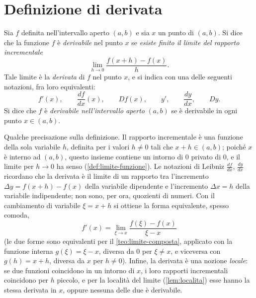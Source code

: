 \section{Definizione di derivata}
\label{sec:def-derivata}

\begin{definizione}[Derivata]\label{def:derivata}
Sia $f$ definita nell'intervallo aperto $(a,b)$ e sia $x$ un punto di $(a,b)$. Si dice
che la funzione $f$ è \emph{derivabile} nel punto $x$ se \emph{esiste finito il limite
del rapporto incrementale}
\begin{equation}\label{eq:def-derivata}
  \lim_{h\to0}\frac{f(x+h)-f(x)}{h}.
\end{equation}
Tale limite è la \emph{derivata} di $f$ nel punto $x$, e si indica con una delle
seguenti notazioni, fra loro equivalenti:
\begin{equation}\label{eq:notazioni-derivata}
  f'(x), \qquad \frac{df}{dx}(x), \qquad Df(x), \qquad y', \qquad \frac{dy}{dx}, \qquad Dy .
\end{equation}
Si dice che $f$ è \emph{derivabile nell'intervallo aperto} $(a,b)$ se è derivabile in ogni
punto $x\in(a,b)$.
\end{definizione}

Qualche precisazione sulla definizione. Il rapporto incrementale è una funzione della
sola variabile $h$, definita per i valori $h\neq0$ tali che $x+h\in(a,b)$; poiché $x$ è
interno ad $(a,b)$, questo insieme contiene un intorno di $0$ privato di $0$, e il limite
per $h\to0$ ha senso (\cref{def:limite-funzione}). Le notazioni di Leibniz
$\frac{df}{dx}$, $\frac{dy}{dx}$ ricordano che la derivata è il limite di un rapporto tra
l'incremento $\Delta y=f(x+h)-f(x)$ della variabile dipendente e l'incremento
$\Delta x=h$ della variabile indipendente; non sono, per ora, quozienti di numeri. Con il
cambiamento di variabile $\xi=x+h$ si ottiene la forma equivalente, spesso comoda,
\begin{equation}\label{eq:derivata-xi}
  f'(x)=\lim_{\xi\to x}\frac{f(\xi)-f(x)}{\xi-x}
\end{equation}
(le due forme sono equivalenti per il \cref{teo:limite-composta}, applicato con la
funzione interna $g(\xi)=\xi-x$, diversa da $0$ per $\xi\neq x$, e viceversa con
$g(h)=x+h$, diversa da $x$ per $h\neq0$).
Infine, la derivata è una nozione \emph{locale}: se due funzioni coincidono in un intorno
di $x$, i loro rapporti incrementali coincidono per $h$ piccolo, e per la località del
limite (\cref{lem:localita}) esse hanno la stessa derivata in $x$, oppure nessuna delle
due è derivabile.

